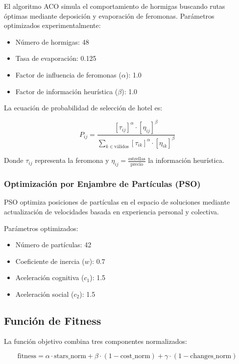\documentclass[runningheads]{llncs}
\begin{document}
El algoritmo ACO simula el comportamiento de hormigas buscando rutas óptimas mediante deposición y evaporación de feromonas. Parámetros optimizados experimentalmente:

\begin{itemize}
\item Número de hormigas: 48
\item Tasa de evaporación: 0.125
\item Factor de influencia de feromonas ($\alpha$): 1.0
\item Factor de información heurística ($\beta$): 1.0
\end{itemize}

La ecuación de probabilidad de selección de hotel es:

\begin{equation}
P_{ij} = \frac{[\tau_{ij}]^{\alpha} \cdot [\eta_{ij}]^{\beta}}{\sum_{k \in \text{válidos}}[\tau_{ik}]^{\alpha} \cdot [\eta_{ik}]^{\beta}}
\end{equation}

Donde $\tau_{ij}$ representa la feromona y $\eta_{ij} = \frac{\text{estrellas}}{\text{precio}}$ la información heurística.

\subsubsection{Optimización por Enjambre de Partículas (PSO)}

PSO optimiza posiciones de partículas en el espacio de soluciones mediante actualización de velocidades basada en experiencia personal y colectiva.

Parámetros optimizados:
\begin{itemize}
\item Número de partículas: 42
\item Coeficiente de inercia ($w$): 0.7
\item Aceleración cognitiva ($c_1$): 1.5
\item Aceleración social ($c_2$): 1.5
\end{itemize}

\subsection{Función de Fitness}

La función objetivo combina tres componentes normalizados:

\begin{equation}
\text{fitness} = \alpha \cdot \text{stars\_norm} + \beta \cdot (1 - \text{cost\_norm}) + \gamma \cdot (1 - \text{changes\_norm})
\end{equation}
\end{document}
